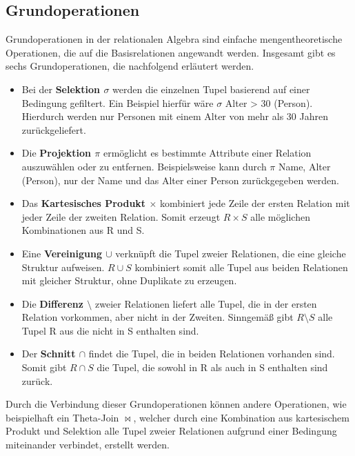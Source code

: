 \subsection{Grundoperationen} %
\label{sec:grundoperationen}
Grundoperationen in der relationalen Algebra sind einfache mengentheoretische Operationen, die auf die Basisrelationen angewandt werden. Insgesamt gibt es sechs Grundoperationen, die nachfolgend erläutert werden.
\begin{itemize}
\item Bei der \textbf{Selektion $\sigma$} werden die einzelnen Tupel basierend auf einer Bedingung gefiltert. Ein Beispiel hierfür wäre  \colorbox{gray!20}{$\sigma$ Alter > 30 (Person)}. Hierdurch werden nur Personen mit einem Alter von mehr als 30 Jahren zurückgeliefert.
\item Die \textbf{Projektion $\pi$} ermöglicht es bestimmte Attribute einer Relation auszuwählen oder zu entfernen. Beispielsweise kann durch \colorbox{gray!20}{$\pi$ Name, Alter (Person)}, nur der Name und das Alter einer Person zurückgegeben werden.
\item Das \textbf{Kartesisches Produkt $\times$} kombiniert jede Zeile der ersten Relation mit jeder Zeile der zweiten Relation. Somit erzeugt  \colorbox{gray!20}{$R \times S$} alle möglichen Kombinationen aus \colorbox{gray!20}{R} und \colorbox{gray!20}{S}.
\item Eine \textbf{Vereinigung $\cup$} verknüpft die Tupel zweier Relationen, die eine gleiche Struktur aufweisen.  \colorbox{gray!20}{$R \cup S$} kombiniert somit alle Tupel aus beiden Relationen mit gleicher Struktur, ohne Duplikate zu erzeugen.
\item Die \textbf{Differenz  $\setminus$} zweier Relationen liefert alle Tupel, die in der ersten Relation vorkommen, aber nicht in der Zweiten. Sinngemäß gibt \colorbox{gray!20}{$R \setminus S$} alle Tupel \colorbox{gray!20}{R} aus die nicht in \colorbox{gray!20}{S} enthalten sind.
\item Der \textbf{Schnitt $\cap$} findet die Tupel, die in beiden Relationen vorhanden sind. Somit gibt \colorbox{gray!20}{$R \cap S$} die Tupel, die sowohl in \colorbox{gray!20}{R} als auch in \colorbox{gray!20}{S} enthalten sind zurück.
\end{itemize}
\noindent Durch die Verbindung dieser Grundoperationen können andere Operationen, wie beispielhaft ein Theta-Join $\bowtie$, welcher durch eine Kombination aus kartesischem Produkt und Selektion alle Tupel zweier Relationen aufgrund einer Bedingung miteinander verbindet, erstellt werden.  \citep{rdb}

